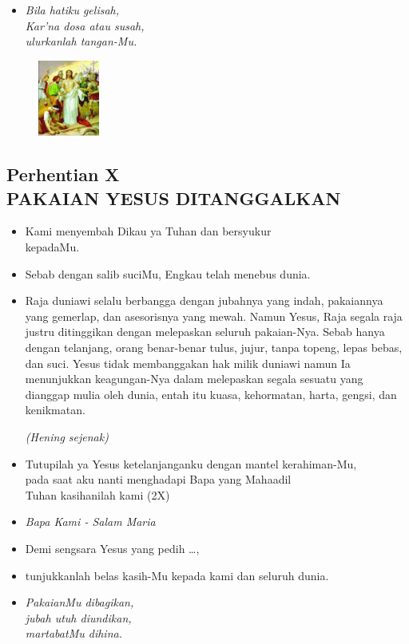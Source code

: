 \documentclass[a5paper,headsepline,titlepage,11pt,nnormalheadings,DIVcalc]{scrbook}
\newcommand{\BU}[1]{\begin{itemize} \item[U:] #1 \end{itemize}}
\newcommand{\BP}[1]{\begin{itemize} \item[P:] #1 \end{itemize}}
\newcommand{\kamiMenyembah}{\BP{ Kami menyembah Dikau ya Tuhan dan bersyukur\\kepadaMu.}
\BU{ Sebab dengan salib suciMu, Engkau telah menebus dunia.}
}
\newcommand{\kasihanilahKami}{\BP{Demi sengsara Yesus yang pedih \ldots,}
\BU{tunjukkanlah belas kasih-Mu kepada kami dan seluruh dunia.}}
\def\hening{\par \textit{(Hening sejenak)}}
\begin{document}
\begin{itemize}
\item[10.] \it{Bila hatiku gelisah,\\
	Kar’na dosa atau susah,\\
	ulurkanlah tangan-Mu.}
\end{itemize}

\begin{figure}
\includegraphics[width=2cm]{jalansalib_files/10_small.jpg}
\end{figure}
\subsection*{Perhentian X\\
PAKAIAN YESUS DITANGGALKAN}

\kamiMenyembah

\BP{Raja duniawi selalu berbangga dengan jubahnya yang indah, pakaiannya yang gemerlap, dan asesorisnya yang mewah. Namun Yesus, Raja segala raja justru ditinggikan dengan melepaskan seluruh pakaian-Nya. Sebab hanya dengan telanjang, orang benar-benar tulus, jujur, tanpa topeng, lepas bebas, dan suci. Yesus tidak membanggakan hak milik duniawi namun Ia menunjukkan keagungan-Nya dalam melepaskan segala sesuatu yang dianggap mulia oleh dunia, entah itu kuasa, kehormatan, harta, gengsi, dan kenikmatan.
\hening
}

\BU{Tutupilah ya Yesus ketelanjanganku dengan mantel kerahiman-Mu,\\ pada saat aku nanti menghadapi Bapa yang Mahaadil\\
Tuhan kasihanilah kami (2X)
}

\large\begin{itemize}\item[~]\it{Bapa Kami - Salam Maria}\end{itemize}\normalsize
\kasihanilahKami

\begin{itemize}
\item[11.] \it{PakaianMu dibagikan,\\
	jubah utuh diundikan,\\
	martabatMu dihina.}
\end{itemize}
\end{document}
